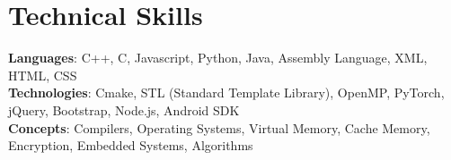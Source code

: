 \section{Technical Skills}
    \begin{itemize}[leftmargin=0.15in, label={}]
	\small{\item{
		\textbf{Languages}{: C++, C, Javascript, Python, Java, Assembly Language, XML, HTML, CSS} \\
		\textbf{Technologies}{: Cmake, STL (Standard Template Library), OpenMP, PyTorch, jQuery, Bootstrap, Node.js, Android SDK } \\
		\textbf{Concepts}{: Compilers, Operating Systems, Virtual Memory, Cache Memory, Encryption, Embedded Systems, Algorithms}
	}}
    \end{itemize}